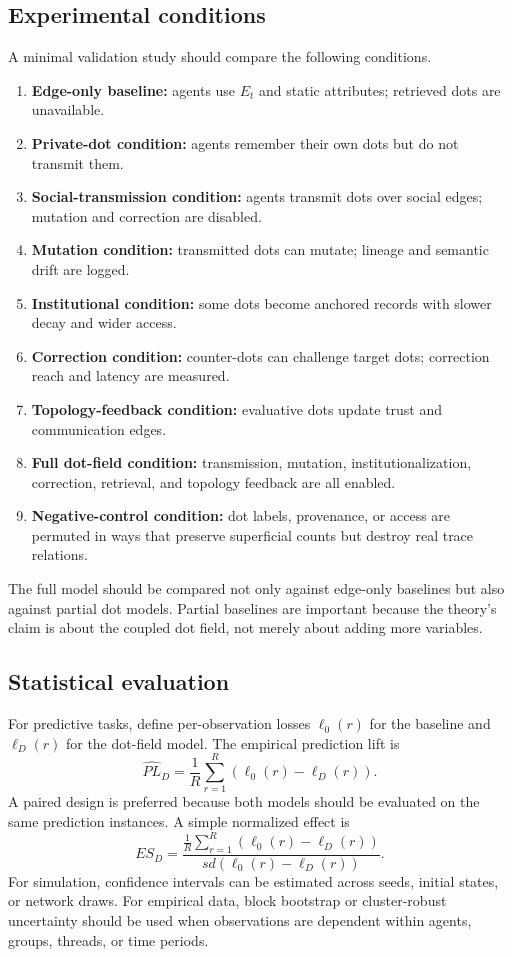 \documentclass[11pt]{article}
\theoremstyle{remark}
\begin{document}
\subsection{Experimental conditions}\label{experimental-conditions}

A minimal validation study should compare the following conditions.

\begin{enumerate}[leftmargin=*]
\item \textbf{Edge-only baseline:} agents use \(E_t\) and static attributes;
retrieved dots are unavailable.
\item \textbf{Private-dot condition:} agents remember their own dots but do not
transmit them.
\item \textbf{Social-transmission condition:} agents transmit dots over social
edges; mutation and correction are disabled.
\item \textbf{Mutation condition:} transmitted dots can mutate; lineage and
semantic drift are logged.
\item \textbf{Institutional condition:} some dots become anchored records with
slower decay and wider access.
\item \textbf{Correction condition:} counter-dots can challenge target dots;
correction reach and latency are measured.
\item \textbf{Topology-feedback condition:} evaluative dots update trust and
communication edges.
\item \textbf{Full dot-field condition:} transmission, mutation,
institutionalization, correction, retrieval, and topology feedback are all
enabled.
\item \textbf{Negative-control condition:} dot labels, provenance, or access are
permuted in ways that preserve superficial counts but destroy real trace
relations.
\end{enumerate}

The full model should be compared not only against edge-only baselines but also
against partial dot models. Partial baselines are important because the theory's
claim is about the coupled dot field, not merely about adding more variables.

\subsection{Statistical evaluation}\label{statistical-evaluation}

For predictive tasks, define per-observation losses
\(\ell_0(r)\) for the baseline and \(\ell_D(r)\) for the dot-field model.
The empirical prediction lift is
\[
\widehat{PL}_D=\frac{1}{R}\sum_{r=1}^R
\left(\ell_0(r)-\ell_D(r)\right).
\]
A paired design is preferred because both models should be evaluated on the same
prediction instances. A simple normalized effect is
\[
ES_D=
\frac{\frac{1}{R}\sum_{r=1}^R(\ell_0(r)-\ell_D(r))}
{sd(\ell_0(r)-\ell_D(r))}.
\]
For simulation, confidence intervals can be estimated across seeds, initial
states, or network draws. For empirical data, block bootstrap or cluster-robust
uncertainty should be used when observations are dependent within agents,
groups, threads, or time periods.
\end{document}
